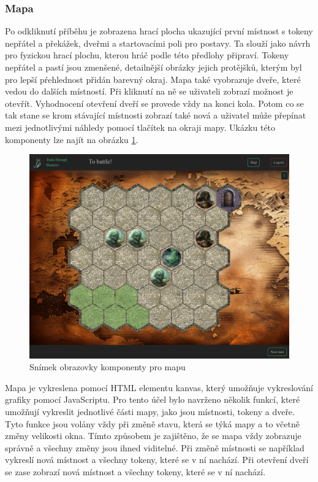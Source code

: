 \subsubsection*{Mapa}
Po odkliknutí příběhu je zobrazena hrací plocha ukazující první místnost s tokeny nepřátel a překážek, dveřmi a startovacími poli pro postavy. Ta slouží jako návrh pro fyzickou hrací plochu, kterou hráč podle této předlohy připraví. Tokeny nepřátel a pastí jsou zmenšené, detailnější obrázky jejich protějšků, kterým byl pro lepší pŕehlednost přidán barevný okraj. Mapa také vyobrazuje dveře, které vedou do dalších místností. Při kliknutí na ně se uživateli zobrazí možnost je otevřít. Vyhodnocení otevření dveří se provede vždy na konci kola. Potom co se tak stane se krom stávající místnosti zobrazí také nová a uživatel může přepínat mezi jednotlivými náhledy pomocí tlačítek na okraji mapy. Ukázku této komponenty lze najít na obrázku \ref{fig:map}.

\begin{figure}[H]
  \centering
  \includegraphics[width=.95\textwidth]{resources/figures/TTS-Map.png}
  \caption{Snímek obrazovky komponenty pro mapu}
  \label{fig:map}
\end{figure}

Mapa je vykreslena pomocí HTML elementu kanvas, který umožňuje vykreslování grafiky pomocí JavaScriptu. Pro tento účel bylo navrženo několik funkcí, které umožňují vykreslit jednotlivé části mapy, jako jsou místnosti, tokeny a dveře. Tyto funkce jsou volány vždy při změně stavu, která se týká mapy a to včetně změny velikosti okna. Tímto způsobem je zajištěno, že se mapa vždy zobrazuje správně a všechny změny jsou ihned viditelné. Při změně místnosti se například vykreslí nová místnost a všechny tokeny, které se v ní nachází. Při otevření dveří se zase zobrazí nová místnost a všechny tokeny, které se v ní nachází. 

